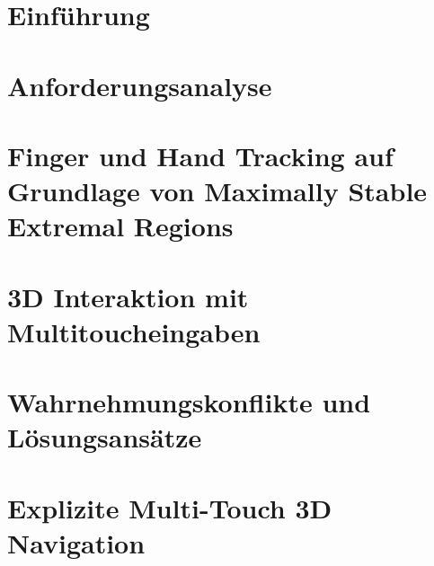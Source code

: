 \documentclass[pdftex,12pt,a4paper]{report}
\begin{document}

\tableofcontents



\chapter{Einführung}
\label{chp:einfuehrung}



\chapter{Anforderungsanalyse}
\label{chp:anforderungsanalyse}



\chapter{Finger und Hand Tracking auf Grundlage von Maximally Stable Extremal Regions}
\label{chp:mser}



\chapter{3D Interaktion mit Multitoucheingaben}
\label{chp:interaktion_mit_multitoucheingaben}



\chapter{Wahrnehmungskonflikte und Lösungsansätze}
\label{chp:wahrnehmungskonflikte_und_loesungsansaetze}



\chapter{Explizite Multi-Touch 3D Navigation}
\label{chp:explizite_interaktion}

\end{document}
